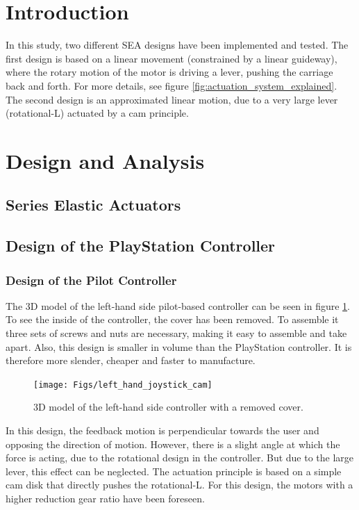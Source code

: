 	\section{Introduction}
	
	
In this study, two different SEA designs have been implemented and tested. The first design is based on a linear movement (constrained by a linear guideway), where the rotary motion of the motor is driving a lever, pushing the carriage back and forth. For more details, see figure \ref{fig:actuation_system_explained}. \\
The second design is an approximated linear motion, due to a very large lever (rotational-L) actuated by a cam principle.
	
	\section{Design and Analysis}
	\subsection{Series Elastic Actuators}
	
		
	\subsection{Design of the PlayStation Controller}
	
	
	
	\subsubsection{Design of the Pilot Controller}
	The 3D model of the left-hand side pilot-based controller can be seen in figure \ref{fig:left_hand_joystick_cam}. To see the inside of the controller, the cover has been removed. To assemble it three sets of screws and nuts are necessary, making it easy to assemble and take apart. Also, this design is smaller in volume than the PlayStation controller. It is therefore more slender, cheaper and faster to manufacture.
	\begin{figure}[h!]
		\centering
		\texttt{[image: Figs/left\_hand\_joystick\_cam]}
		\caption{3D model of the left-hand side controller with a removed cover.}
		\label{fig:left_hand_joystick_cam}
	\end{figure}

	In this design, the feedback motion is perpendicular towards the user and opposing the direction of motion. However, there is a slight angle at which the force is acting, due to the rotational design in the controller. But due to the large lever, this effect can be neglected. The actuation principle is based on a simple cam disk that directly pushes the rotational-L. For this design, the motors with a higher reduction gear ratio have been foreseen.
	
